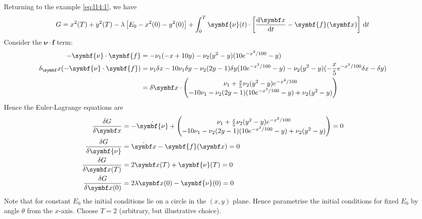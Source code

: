 \documentclass{jknotes}
\begin{document}
Returning to the example \eqref{eq:l14:1}, we have
\begin{equation}
	G = x^2(T) + y^2(T) -\lambda\left[E_0 -x^2(0) - y^2(0)\right] + \int_0^T
	\symbf{\nu}(t) \cdot \left[ \frac{\diffd \x}{\diffd t} - \symbf{f}(\x) \right] \,
	\diffd t
\end{equation}
Consider the $\symbf{\nu}\cdot\symbf{f}$ term:
\begin{align}
	-\symbf{\nu}\cdot\symbf{f} &= -\nu_1(-x+10y) - \nu_2
	(y^2-y)(10e^{-x^2/100}-y) \\
	\delta_\x (-\symbf{\nu}\cdot\symbf{f}) &= \nu_1 \delta x - 10\nu_1 \delta
	y - \nu_2 (2y-1)\delta y(10e^{-x^2/100}-y) -
	\nu_2(y^2-y)(-\frac{x}{5}e^{-x^2/100}\delta x - \delta y) \\
	&= \delta \x \cdot \begin{pmatrix}
		\nu_1 + \frac{x}{5}\nu_2 (y^2-y)e^{-x^2/100} \\
		-10\nu_1 - \nu_2(2y-1)(10e^{-x^2/100}-y)+\nu_2(y^2-y)
	\end{pmatrix}
\end{align}
Hence the Euler-Lagrange equations are
\begin{align}
	\frac{\delta G}{\delta \x} &= -\dot{\symbf{\nu}} + \begin{pmatrix} \nu_1 +
		\frac{x}{5}\nu_2(y^2-y)e^{-x^2/100} \\ -10\nu_1 -
	\nu_2(2y-1)(10e^{-x^2/100} -y)+\nu_2(y^2-y) \end{pmatrix} = 0\\
	\frac{\delta G}{\delta \symbf{\nu}} &= \dot{\x} - \symbf{f}(\x) = 0 \\
	\frac{\delta G}{\delta \x(T)} &=  2\x(T) + \symbf{\nu}(T) = 0 \\
	\frac{\delta G}{\delta \x(0)} &= 2\lambda \x(0) - \symbf{\nu}(0) = 0
\end{align}
Note that for constant $E_0$ the initial conditions lie on a circle in the
$(x,y)$ plane. Hence parametrise the initial conditions for fixed $E_0$ by
angle $\theta$ from the $x$-axis. Choose $T=2$ (arbitrary, but illustrative
choice).
\end{document}

